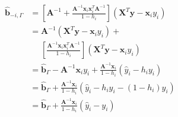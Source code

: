 \documentclass[10pt]{article}
\begin{document}
\begin{align*}\begin{split}
\boldsymbol{\hat{b}}_{-i,\Gamma} &= 
\left[ \boldsymbol A^{-1} + 
\frac{\boldsymbol A^{-1} \boldsymbol x_i \boldsymbol x_i^T \boldsymbol A^{-1}}{1 - h_i} \right] 
\left(\boldsymbol X^T \boldsymbol y - \boldsymbol x_i y_i \right) \\
&= \boldsymbol A^{-1}\left(\boldsymbol X^T \boldsymbol y - \boldsymbol x_i y_i \right) + \\
&\phantom{=} \left[\frac{\boldsymbol A^{-1} \boldsymbol x_i \boldsymbol x_i^T \boldsymbol A^{-1}}{1 - h_i}\right]
\left(\boldsymbol X^T \boldsymbol y - \boldsymbol x_i y_i \right) \\
&= \boldsymbol{\hat{b}}_\Gamma - 
\boldsymbol A^{-1} \boldsymbol x_i y_i +
\frac{\boldsymbol A^{-1} \boldsymbol x_i}{1 - h_i}
\left(\hat{y}_i - h_i y_i \right) \\
&= \boldsymbol{\hat{b}}_\Gamma + 
\frac{\boldsymbol A^{-1} \boldsymbol x_i}{1 - h_i}
\left(\hat{y}_i - h_i y_i - \left(1 - h_i\right) y_i \right) \\
&= \boldsymbol{\hat{b}}_\Gamma + 
\frac{\boldsymbol A^{-1} \boldsymbol x_i}{1 - h_i}
\left(\hat{y}_i - y_i \right) \\
\end{split}\end{align*}
\end{document}
